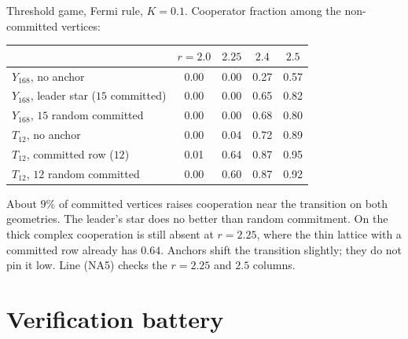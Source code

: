 \begin{remark}\label{V3P5:rem:anchorsmc}
Threshold game, Fermi rule, $K=0.1$. Cooperator fraction among the non-committed vertices:
\begin{center}
\small
\begin{tabular}{lcccc}
\toprule
& $r=2.0$ & $2.25$ & $2.4$ & $2.5$\\
\midrule
$Y_{168}$, no anchor & 0.00 & 0.00 & 0.27 & 0.57\\
$Y_{168}$, leader star ($15$ committed) & 0.00 & 0.00 & 0.65 & 0.82\\
$Y_{168}$, $15$ random committed & 0.00 & 0.00 & 0.68 & 0.80\\
$T_{12}$, no anchor & 0.00 & 0.04 & 0.72 & 0.89\\
$T_{12}$, committed row ($12$) & 0.01 & 0.64 & 0.87 & 0.95\\
$T_{12}$, $12$ random committed & 0.00 & 0.60 & 0.87 & 0.92\\
\bottomrule
\end{tabular}
\end{center}
About $9\%$ of committed vertices raises cooperation near the transition on both geometries. The
leader's star does no better than random commitment. On the thick complex cooperation is still
absent at $r=2.25$, where the thin lattice with a committed row already has $0.64$. Anchors
shift the transition slightly; they do not pin it low. Line (NA5) checks the $r=2.25$ and $2.5$
columns.
\end{remark}

\section{Verification battery}\label{V3P5:sec:battery}

